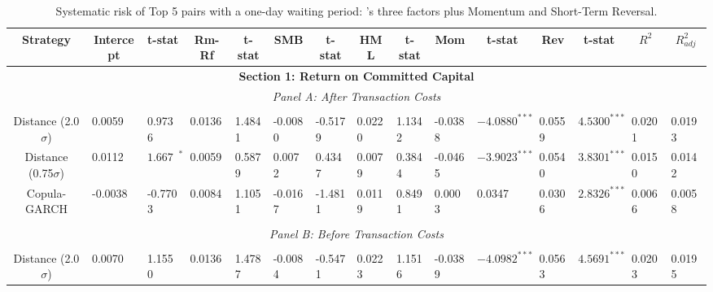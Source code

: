 \documentclass[a4paper]{article}
\begin{document}
\begin{sidewaystable}
	\caption{Systematic risk of Top 5 pairs with a one-day waiting period: \citet*{ff93}'s three factors plus Momentum and Short-Term Reversal.}
	\begin{threeparttable}[H]
		\centering \scriptsize
		\begin{tabularx}{\textwidth}{@{\extracolsep{\fill}}lllllllllllllll@{}}
			\toprule
			\multicolumn{1}{c}{Strategy} & \multicolumn{1}{c}{Intercept} & \multicolumn{1}{c}{t-stat} & \multicolumn{1}{c}{Rm-Rf} & \multicolumn{1}{c}{t-stat} & \multicolumn{1}{c}{SMB} & \multicolumn{1}{c}{t-stat} & \multicolumn{1}{c}{HML} & \multicolumn{1}{c}{t-stat} & \multicolumn{1}{c}{Mom} & \multicolumn{1}{c}{t-stat} & \multicolumn{1}{c}{Rev} & \multicolumn{1}{c}{t-stat} & \multicolumn{1}{c}{$R^{2}$} & \multicolumn{1}{c}{$R^{2}_{adj}$} \\
			\midrule
			\multicolumn{15}{c}{\textbf{Section 1: Return on Committed Capital}} \\
			\multicolumn{15}{c}{\textit{Panel A: After Transaction Costs}} \\
			\multicolumn{1}{c}{} & \multicolumn{1}{c}{} & \multicolumn{1}{c}{} & \multicolumn{1}{c}{} & \multicolumn{1}{c}{} & \multicolumn{1}{c}{} & \multicolumn{1}{c}{} & \multicolumn{1}{c}{} &       &       &       &       &       &       &  \\
			\multicolumn{1}{c}{Distance (2.0$\sigma$)} & 0.0059 & 0.9736 & 0.0136 & 1.4841 & -0.0080 & -0.5179 & 0.0220 & 1.1342 & -0.0388 & $-4.0880^{***}$ & 0.0559 & $4.5300^{***}$ & 0.0201 & 0.0193 \\
			\multicolumn{1}{c}{Distance (0.75$\sigma$)} & 0.0112 & $1.6671^{*}$ & 0.0059 & 0.5879 & 0.0072 & 0.4347 & 0.0079 & 0.3844 & -0.0465 & $-3.9023^{***}$ & 0.0540 & $3.8301^{***}$ & 0.0150 & 0.0142 \\
			\multicolumn{1}{c}{Copula-GARCH} & -0.0038 & -0.7703 & 0.0084 & 1.1051 & -0.0167 & -1.4811 & 0.0119 & 0.8491 & 0.0003 & 0.0347 & 0.0306 & $2.8326^{***}$ & 0.0066 & 0.0058 \\
			&       &       &       &       &       &       &       &       &       &       &       &       &       &  \\
			\multicolumn{15}{c}{\textit{Panel B: Before Transaction Costs}} \\
			&       &       &       &       &       &       &       &       &       &       &       &       &       &  \\
			\multicolumn{1}{c}{Distance (2.0$\sigma$)} & 0.0070 & 1.1550 & 0.0136 & 1.4787 & -0.0084 & -0.5471 & 0.0223 & 1.1516 & -0.0389 & $-4.0982^{***}$ & 0.0563 & $4.5691^{***}$ & 0.0203 & 0.0195 \\

\end{tabularx}
\end{threeparttable}
\end{sidewaystable}
\end{document}
